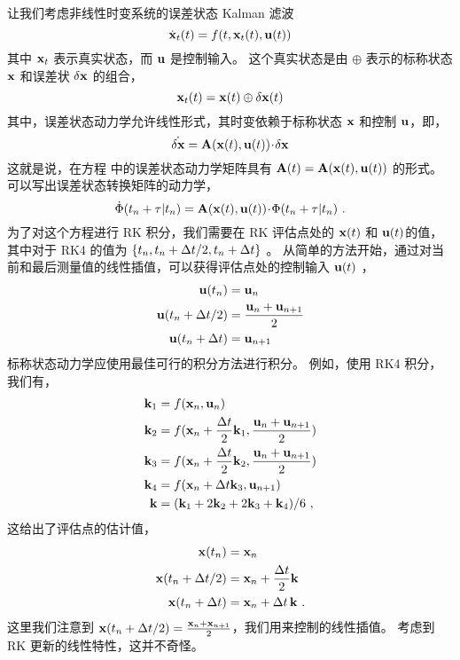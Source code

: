 让我们考虑非线性时变系统的误差状态 Kalman 滤波
%
\begin{equation}
\dot{{\bf x}}_t(t) = f(t, {\bf x}_t(t), {\bf u}(t))
\end{equation}
%
其中 ${\bf x}_t$ 表示真实状态，而 ${\bf u}$ 是控制输入。 
这个真实状态是由 $\oplus$ 表示的标称状态 ${\bf x}$ 和误差状 $\delta{\bf x}$ 的组合，
%
\begin{equation}
{\bf x}_t(t) = {\bf x}(t) \oplus \delta{\bf x}(t)
\end{equation}
%
其中，误差状态动力学允许线性形式，其时变依赖于标称状态 ${\bf x}$ 和控制 ${\bf u}$，即，
%
\begin{equation}
\dot{\delta{\bf x}} = {\bf A}({\bf x}(t),{\bf u}(t))\!\cdot\!\delta{\bf x}
\end{equation}
%
这就是说，在方程  中的误差状态动力学矩阵具有 ${\bf A}(t) = {\bf A}({\bf x}(t),{\bf u}(t))$ 的形式。 
可以写出误差状态转换矩阵的动力学，
%
\begin{equation}
\dot{\Phi}(t_n+\tau|t_n)={\bf A}({\bf x}(t),{\bf u}(t))\!\cdot\!\Phi(t_n+\tau|t_n)~.
\end{equation}
%
为了对这个方程进行 RK 积分，我们需要在 RK 评估点处的 ${\bf x}(t)$ 和 ${\bf u}(t)$的值，其中对于 RK4 的值为 $\{t_n,t_n+\Delta t/2,t_n+\Delta t\}$ 。
从简单的方法开始，通过对当前和最后测量值的线性插值，可以获得评估点处的控制输入 ${\bf u}(t)$ ，
%
%
\begin{align}
{\bf u}(t_n) &= {\bf u}_n\\
{\bf u}(t_n+\Delta t/2) &= \frac{{\bf u}_n+{\bf u}_{n+1}}{2} \\
{\bf u}(t_n+\Delta t) &= {\bf u}_{n+1}
\end{align}%
%
标称状态动力学应使用最佳可行的积分方法进行积分。 
例如，使用 RK4 积分，我们有，
%
%
\begin{align*}
{\bf k}_1 &= f({\bf x}_n,{\bf u}_n) \nonumber \\
{\bf k}_2 &= f({\bf x}_n+\frac{\Delta t}{2}{\bf k}_1,\frac{{\bf u}_n+{\bf u}_{n+1}}{2}) \nonumber\\
{\bf k}_3 &= f({\bf x}_n+\frac{\Delta t}{2}{\bf k}_2,\frac{{\bf u}_n+{\bf u}_{n+1}}{2}) \nonumber\\
{\bf k}_4 &= f({\bf x}_n+\Delta t{\bf k}_3,{\bf u}_{n+1}) \nonumber\\
{\bf k} &= ({\bf k}_1+2{\bf k}_2+2{\bf k}_3+{\bf k}_4)/6 ~,
\end{align*}%
%
这给出了评估点的估计值，
%
%
\begin{align}
{\bf x}(t_n) &= {\bf x}_n \\
{\bf x}(t_n+\Delta t/2) &= {\bf x}_n+\frac{\Delta t}{2}{\bf k}\\
{\bf x}(t_n+\Delta t) &= {\bf x}_n+\Delta t\,{\bf k} ~.
\end{align}%
%
这里我们注意到 ${\bf x}(t_n+\Delta t/2)=\frac{{\bf x}_n+{\bf x}_{n+1}}{2}$，我们用来控制的线性插值。 
考虑到 RK 更新的线性特性，这并不奇怪。

